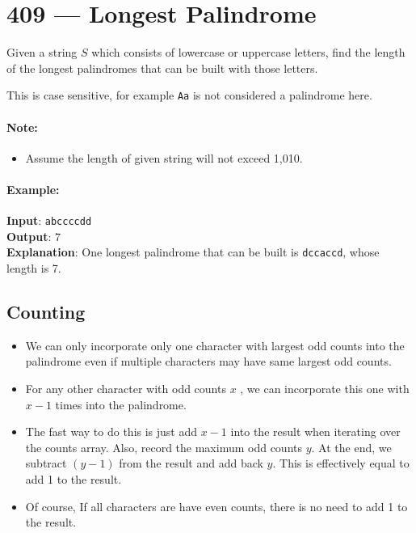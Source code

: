 \section{409 --- Longest Palindrome}
Given a string $S$ which consists of lowercase or uppercase letters, find the length of the longest palindromes that can be built with those letters.
\par
This is case sensitive, for example \texttt{Aa} is not considered a palindrome here.

\paragraph{Note:}
\begin{itemize}
\item Assume the length of given string will not exceed 1,010.
\end{itemize}

\paragraph{Example:}

\begin{flushleft}
\textbf{Input}: \texttt{abccccdd}
\\
\textbf{Output}: 7
\\
\textbf{Explanation}: One longest palindrome that can be built is \texttt{dccaccd}, whose length is 7.
\end{flushleft}

\subsection{Counting}
\begin{itemize}
\item We can only incorporate only one character with largest odd counts into the palindrome even if multiple characters may have same largest odd counts.
\item For any other character with odd counts $x$ , we can incorporate this one with $x-1$ times into the palindrome.
\item The fast way to do this is just add $x-1$ into the result when iterating over the counts array. Also, record the maximum odd counts $y$. At the end, we subtract $(y-1)$ from the result and add back $y$. This is effectively equal to add 1 to the result.
\item Of course, If all characters are have even counts, there is no need to add 1 to the result.
\end{itemize}

